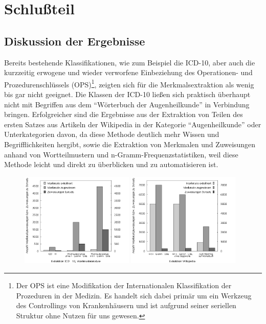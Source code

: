 \documentclass[pagesize,paper=A4,DIV=calc,fontsize=12pt,draft=false]{scrreprt}
\begin{document}
\chapter{Schlußteil}

\section{Diskussion der Ergebnisse}

Bereits bestehende Klassifikationen, wie zum Beispiel die ICD-10, aber auch die kurzzeitig erwogene und wieder verworfene Einbeziehung des Operationen- und Prozedurenschlüssels (OPS)\footnote{Der OPS ist eine Modifikation der Internationalen Klassifikation der Prozeduren in der Medizin. Es handelt sich dabei primär um ein Werkzeug des Controllings von Krankenhäusern und ist aufgrund seiner seriellen Struktur ohne Nutzen für uns gewesen.}, zeigten sich für die Merkmalsextraktion als wenig bis gar nicht geeignet. 
Die Klassen der ICD-10 ließen sich praktisch überhaupt nicht mit Begriffen aus dem \enquote{Wörterbuch der Augenheilkunde} in Verbindung bringen. 
Erfolgreicher sind die Ergebnisse aus der Extraktion von Teilen des ersten Satzes aus Artikeln der Wikipedia in der Kategorie \enquote{Augenheilkunde} oder Unterkategorien davon, da diese Methode deutlich mehr Wissen und Begrifflichkeiten hergibt, sowie die Extraktion von Merkmalen und Zuweisungen anhand von Wortteilmustern und n-Gramm-Frequenzstatistiken, weil diese Methode leicht und direkt zu überblicken und zu automatisieren ist. 

\begin{figure}[!ht]
\includegraphics[width=0.48\textwidth]{icd10_affixe}
\hfill
\includegraphics[width=0.48\textwidth]{wiki_extraktion}
\end{figure}
\end{document}
